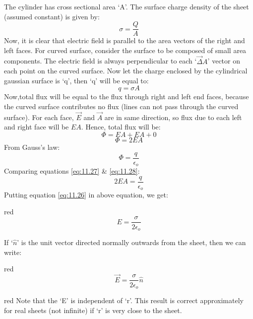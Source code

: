 The cylinder has cross sectional area ‘A’.
The surface charge density of the sheet (assumed constant) is given by:
\begin{equation}
  \sigma = \frac{Q}{A} \nonumber
\end{equation}
Now, it is clear that electric field is parallel to the area
vectors of the right and left faces. For curved surface,
consider the surface to be composed of small area components.
The electric field is always perpendicular to each ‘$\vec\Delta A$’
vector on each point on the curved surface. Now let the charge
enclosed by the cylindrical gaussian surface is ‘q’,
then ‘q’ will be equal to:
\begin{equation}\label{eq:11.26}
  q = \sigma A
\end{equation}
Now,total flux will be equal to the flux through right and left end faces,
because the curved surface contributes no flux (lines can  not pass
through the curved surface). For each face, $\vec{E}$ and $\vec{A}$
are in same direction, so flux due to each left and right face will be $EA$.
Hence, total flux will be:
\begin{equation}
  \Phi = EA + EA + 0 \nonumber
\end{equation}
\begin{equation}\label{eq:11.27}
  \Phi = 2EA 
\end{equation}
From Gauss's law:
\begin{equation}\label{eq:11.28}
  \Phi = \frac{q}{\epsilon_{o}}
\end{equation}
Comparing equations \ref{eq:11.27} \& \ref{eq:11.28}:
\begin{equation}
  2EA = \frac{q}{\epsilon_{o}} \nonumber
\end{equation}
Putting equation \ref{eq:11.26} in above equation, we get:
\begin{mybox}{red}{}
\begin{equation}\label{eq:11.29}
  E = \frac{\sigma}{2\epsilon_{o}}
\end{equation}
\end{mybox}
If `$\hat{n}$' is the unit vector directed normally outwards from the sheet,
then we can write:
\begin{mybox}{red}{}
  \begin{equation}\label{eq:11.30}
    \vec{E} = \frac{\sigma}{2\epsilon_{o}} \hat{n}
  \end{equation}  
\end{mybox}{red}{}
Note that the ‘E’ is independent of ‘r’. This result is correct
approximately for real sheets (not infinite) if ‘r’ is very close
to the sheet.
